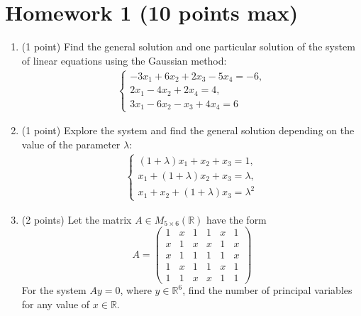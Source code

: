 \documentclass{article}
\begin{document}
\section*{Homework 1 (10 points max)}
\begin{enumerate}
  \item (1 point) Find the general solution and one particular solution of the system of linear equations using the Gaussian method:
  \begin{align*}
    \begin{cases}
      -3x_1 + 6x_2 + 2x_3 - 5x_4 = -6, \\
      2x_1 - 4x_2 + 2x_4 = 4, \\
      3x_1 - 6x_2 - x_3 + 4x_4 = 6
    \end{cases}
  \end{align*}

  \item (1 point) Explore the system and find the general solution depending on the value of the parameter $\lambda$:
  \begin{align*}
    \begin{cases}
      (1 + \lambda)x_1 + x_2 + x_3 = 1, \\
      x_1 + (1 + \lambda)x_2 + x_3 = \lambda, \\
      x_1 + x_2 + (1 + \lambda)x_3 = \lambda^2
    \end{cases}
  \end{align*}

  \item (2 points) Let the matrix $A \in M_{5\times6}(\mathbb{R})$ have the form
  \begin{equation*}
    A = \begin{pmatrix}
      1 & x & 1 & 1 & x & 1 \\
      x & 1 & x & x & 1 & x \\
      x & 1 & 1 & 1 & 1 & x \\
      1 & x & 1 & 1 & x & 1 \\
      1 & 1 & x & x & 1 & 1
    \end{pmatrix}
  \end{equation*}
  For the system $Ay = 0$, where $y \in \mathbb{R}^6$, find the number of principal variables for any value of $x \in \mathbb{R}$.


\end{enumerate}
\end{document}
